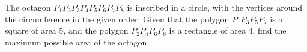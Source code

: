 
The octagon $P_1P_2P_3P_4P_5P_6P_7P_8$ is inscribed in a circle, with
the
vertices around the circumference in the given order.  Given that the
polygon
$P_1P_3P_5P_7$ is a square of area 5, and the polygon $P_2P_4P_6P_8$ is a
rectangle of area 4, find the maximum possible area of the octagon.
